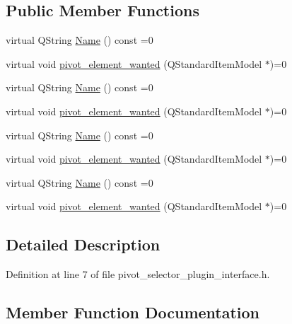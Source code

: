 \subsection*{Public Member Functions}
\begin{DoxyCompactItemize}
\item 
virtual Q\+String \hyperlink{classPivot__Selector__Plugin__Interface_a35b4215e27a169edc2260f2e578de184}{Name} () const =0
\item 
virtual void \hyperlink{classPivot__Selector__Plugin__Interface_a79edca6930746a137a95a26239f7af5e}{pivot\+\_\+element\+\_\+wanted} (Q\+Standard\+Item\+Model $\ast$)=0
\item 
virtual Q\+String \hyperlink{classPivot__Selector__Plugin__Interface_a35b4215e27a169edc2260f2e578de184}{Name} () const =0
\item 
virtual void \hyperlink{classPivot__Selector__Plugin__Interface_a79edca6930746a137a95a26239f7af5e}{pivot\+\_\+element\+\_\+wanted} (Q\+Standard\+Item\+Model $\ast$)=0
\item 
virtual Q\+String \hyperlink{classPivot__Selector__Plugin__Interface_a35b4215e27a169edc2260f2e578de184}{Name} () const =0
\item 
virtual void \hyperlink{classPivot__Selector__Plugin__Interface_a79edca6930746a137a95a26239f7af5e}{pivot\+\_\+element\+\_\+wanted} (Q\+Standard\+Item\+Model $\ast$)=0
\item 
virtual Q\+String \hyperlink{classPivot__Selector__Plugin__Interface_a35b4215e27a169edc2260f2e578de184}{Name} () const =0
\item 
virtual void \hyperlink{classPivot__Selector__Plugin__Interface_a79edca6930746a137a95a26239f7af5e}{pivot\+\_\+element\+\_\+wanted} (Q\+Standard\+Item\+Model $\ast$)=0
\end{DoxyCompactItemize}


\subsection{Detailed Description}


Definition at line 7 of file pivot\+\_\+selector\+\_\+plugin\+\_\+interface.\+h.



\subsection{Member Function Documentation}
\mbox{\label{classPivot__Selector__Plugin__Interface_a35b4215e27a169edc2260f2e578de184}} 

